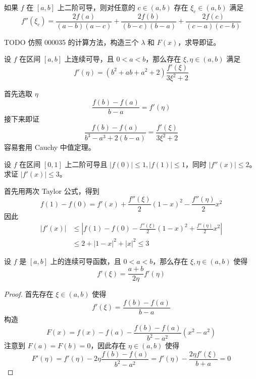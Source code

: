 \begin{problem}[000037]
如果 $f$ 在 $[a, b]$ 上二阶可导，则对任意的 $c \in (a, b)$ 存在 $\xi_c \in (a, b)$ 满足
\[ f''(\xi_c) = \frac{2 f(a)}{(a - b)(a - c)} + \frac{2 f(b)}{(b - c)(b - a)} + \frac{2f(c)}{(c- a)(c - b)} \]
\end{problem}

\begin{solution}
	TODO 仿照 000035 的计算方法，构造三个 $\lambda$ 和 $F(x)$，求导即证。
\end{solution}

\begin{problem}[000038]
设 $f$ 在区间 $[a, b]$ 上连续可导，且 $0 < a < b$，那么存在 $\xi, \eta \in (a, b)$ 满足
\[ f'(\eta) = (b^2 + ab + a^2 + 2)\frac{f'(\xi)}{3 \xi^2 + 2} \]
\end{problem}

\begin{solution}
	首先选取 $\eta$
	\[ \frac{f(b) - f(a)}{b - a} = f'(\eta) \]
	接下来即证
	\[ \frac{f(b) - f(a)}{b^3 - a^3 + 2(b - a)} = \frac{f'(\xi)}{3\xi^2 + 2} \]
	容易套用 Cauchy 中值定理。
\end{solution}

\begin{problem}[000039]
设 $f$ 在区间 $[0, 1]$ 上二阶可导且 $|f(0)| \leqslant 1, |f(1)| \leqslant 1$，同时 $|f''(x)| \leqslant 2$。求证 $|f'(x)| \leqslant 3$。
\end{problem}

\begin{solution}
	首先用两次 Taylor 公式，得到
	\[ f(1) - f(0) = f'(x) + \frac{f''(\xi)}{2}(1 - x)^2 - \frac{f''(\eta)}{2}x^2 \]
	因此
	\[ \begin{aligned}
			|f'(x)| & \leqslant \left| f(1) - f(0) - \frac{f''(\xi)}{2}(1 - x)^2 + \frac{f''(\eta)}{2}x^2 \right| \\
			        & \leqslant 2 + |1-x|^2 + |x|^2 \leqslant 3
		\end{aligned} \]
\end{solution}

\begin{problem}[000040]
设 $f$ 是 $[a,b]$ 上的连续可导函数，且 $0 < a < b$，那么存在 $\xi, \eta \in (a,b)$ 使得
\[ f'(\xi) = \frac{a+b}{2\eta}f'(\eta) \]
\end{problem}

\begin{proof}
	首先存在 $\xi \in (a,b)$ 使得
	\[ f'(\xi) = \frac{f(b) - f(a)}{b - a} \]
	构造
	\[ F(x) = f(x) - f(a) - \frac{f(b) - f(a)}{b^2 - a^2}(x^2 - a^2) \]
	注意到 $F(a) = F(b) = 0$，因此存在 $\eta \in (a, b)$ 使得
	\[ F'(\eta) = f'(\eta) - 2 \eta \frac{f(b) - f(a)}{b^2 - a^2} = f'(\eta) - \frac{2 \eta f'(\xi)}{b + a} = 0 \]
\end{proof}

